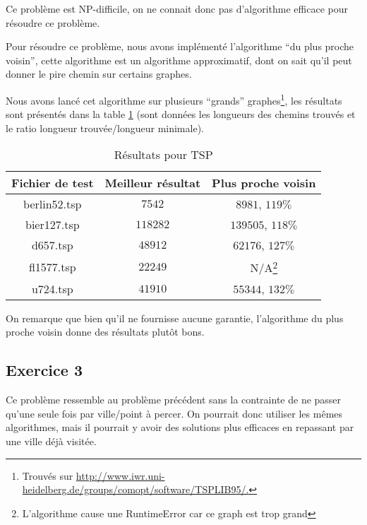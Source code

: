 \documentclass[draft]{scrartcl}
\begin{document}
    Ce problème est NP-difficile, on ne connait donc pas d'algorithme efficace
    pour résoudre ce problème.    

    Pour résoudre ce problème, nous avons implémenté l'algorithme ``du plus
    proche voisin'', cette algorithme est un algorithme approximatif, dont on
    sait qu'il peut donner le pire chemin sur certains graphes.

    Nous avons lancé cet algorithme sur plusieurs ``grands''
    graphes\footnote{Trouvés sur
      \url{http://www.iwr.uni-heidelberg.de/groups/comopt/software/TSPLIB95/.}
    }, les résultats sont présentés dans la table \ref{table:tsp} (sont données
    les longueurs des chemins trouvés et le ratio longueur trouvée/longueur
    minimale).

    \begin{center}\begin{table}[h]
      \centering
      \begin{tabular}{| c | c | c |}
      \hline
      Fichier de test & Meilleur résultat & Plus proche voisin\\
      \hline
      berlin52.tsp & $7542$  & $8981$, $119\%$ \\
      bier127.tsp & $118282$  & $139505$, $118\%$ \\
      d657.tsp & $48912$  & $62176$, $127\%$ \\
      fl1577.tsp & $22249$  & N/A\footnote{L'algorithme cause une RuntimeError
                                           car ce graph est trop grand} \\
      u724.tsp     & $41910$ & $55344$, $132\%$\\
      \hline  
      \end{tabular}
      \caption{Résultats pour TSP}
      \label{table:tsp}
    \end{table}\end{center}

    On remarque que bien qu'il ne fournisse aucune garantie, l'algorithme du
    plus proche voisin donne des résultats plutôt bons. %

  \subsection{Exercice 3}
    Ce problème ressemble au problème précédent sans la contrainte de ne passer
    qu'une seule fois par ville/point à percer. On pourrait donc utiliser les
    mêmes algorithmes, mais il pourrait y avoir des solutions plus efficaces en
    repassant par une ville déjà visitée.

 
\end{document}
